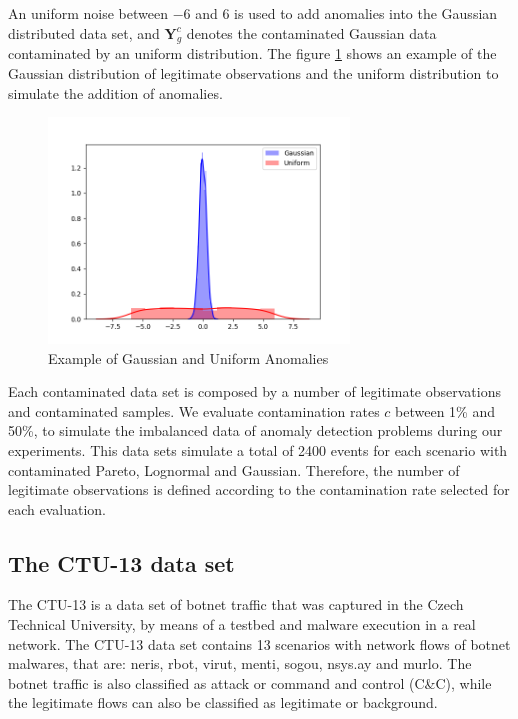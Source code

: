 An uniform noise between $-6$ and $6$ is used to add anomalies into the Gaussian distributed data set, and $\pmb{Y}_g^c$ denotes the contaminated Gaussian data contaminated by an uniform distribution. The figure \ref{fig:4.04} shows an example of the Gaussian distribution of legitimate observations and the uniform distribution to simulate the addition of anomalies.

\begin{figure}[h!]
	\centering
	\includegraphics[width=8cm]{figures/ch4/4_Xgu2.png}
	\caption{Example of Gaussian and Uniform Anomalies}
	\label{fig:4.04}
\end{figure}

Each contaminated data set is composed by a number of legitimate observations and contaminated samples. We evaluate contamination rates $c$ between 1\% and 50\%, to simulate the imbalanced data of anomaly detection problems during our experiments. This data sets simulate a total of 2400 events for each scenario with contaminated Pareto, Lognormal and Gaussian. Therefore, the number of legitimate observations is defined according to the contamination rate selected for each evaluation.


\subsection{The CTU-13 data set}
\label{sec:3_CTU-13}

The CTU-13 \cite{garcia2014empirical} is a data set of botnet traffic that was captured in the Czech Technical University, by means of a testbed and malware execution in a real network. The CTU-13 data set contains 13 scenarios with network flows of botnet malwares, that are: neris, rbot, virut, menti, sogou, nsys.ay and murlo. The botnet traffic is also classified as attack or command and control (C\&C), while the legitimate flows can also be classified as legitimate or background.

